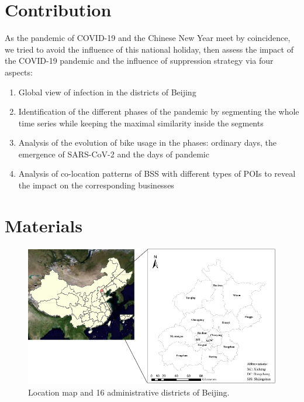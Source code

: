 \documentclass[preprints,ijgi,submit,moreauthors]{Definitions/mdpi}
\begin{document}
\section*{Contribution} As the pandemic of COVID-19 and the Chinese New Year meet by coincidence, we tried to avoid the influence of this national holiday, then assess the impact of the COVID-19 pandemic and the influence of suppression strategy via four aspects:
\begin{enumerate}
    \item Global view of infection in the districts of Beijing
    \item Identification of the different phases of the pandemic by segmenting the whole time series while keeping the maximal similarity inside the segments
    \item Analysis of the evolution of bike usage in the phases: ordinary days, the emergence of SARS-CoV-2 and the days of pandemic
    \item Analysis of co-location patterns of BSS with different types of POIs to reveal the impact on the corresponding businesses
\end{enumerate}

\section{Materials}

\begin{figure}[ht]
    \centering
    \includegraphics[width=\textwidth]{Figures/StudyArea.pdf}
    \caption{Location map and 16 administrative districts of Beijing.}
    \label{fig:study_area}
\end{figure}
\end{document}
